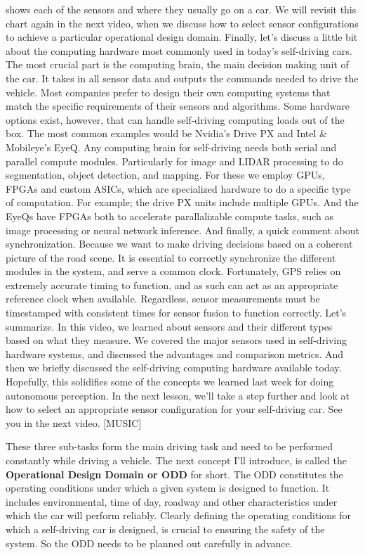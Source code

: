 shows each of the sensors and where they usually go on a car. We will revisit this chart again in the
next video, when we discuss how to select sensor configurations to achieve
a particular operational design domain. Finally, let's discuss a little bit about
the computing hardware most commonly used in today's self-driving cars. The most crucial part
is the computing brain, the main decision making unit of the car. It takes in all sensor data and outputs
the commands needed to drive the vehicle. Most companies prefer to design their own
computing systems that match the specific requirements of their sensors and
algorithms. Some hardware options exist, however, that can handle self-driving
computing loads out of the box. The most common examples would be Nvidia's
Drive PX and Intel & Mobileye's EyeQ. Any computing brain for self-driving needs
both serial and parallel compute modules. Particularly for image and
LIDAR processing to do segmentation, object detection, and mapping. For these we employ GPUs,
FPGAs and custom ASICs, which are specialized hardware to
do a specific type of computation. For example; the drive PX
units include multiple GPUs. And the EyeQs have FPGAs both to
accelerate parallalizable compute tasks, such as image processing or
neural network inference. And finally,
a quick comment about synchronization. Because we want to make driving
decisions based on a coherent picture of the road scene. It is essential to correctly synchronize
the different modules in the system, and serve a common clock. Fortunately, GPS relies on extremely
accurate timing to function, and as such can act as an appropriate
reference clock when available. Regardless, sensor measurements must be
timestamped with consistent times for sensor fusion to function correctly. Let's summarize. In this video,
we learned about sensors and their different types based
on what they measure. We covered the major sensors used in
self-driving hardware systems, and discussed the advantages and
comparison metrics. And then we briefly discussed
the self-driving computing hardware available today. Hopefully, this solidifies some of
the concepts we learned last week for doing autonomous perception. In the next lesson, we'll take a step
further and look at how to select an appropriate sensor configuration for
your self-driving car. See you in the next video. [MUSIC]



These three sub-tasks form the main driving task and need to be performed constantly while driving a vehicle. The next concept I'll introduce, is called the {\textbf {Operational Design Domain or ODD}} for short. The ODD constitutes the operating conditions under which a given system is designed to function. It includes environmental, time of day, roadway and other characteristics under which the car will perform reliably. Clearly defining the operating conditions for which a self-driving car is designed, is crucial to ensuring the safety of the system. So the ODD needs to be planned out carefully in advance. 


